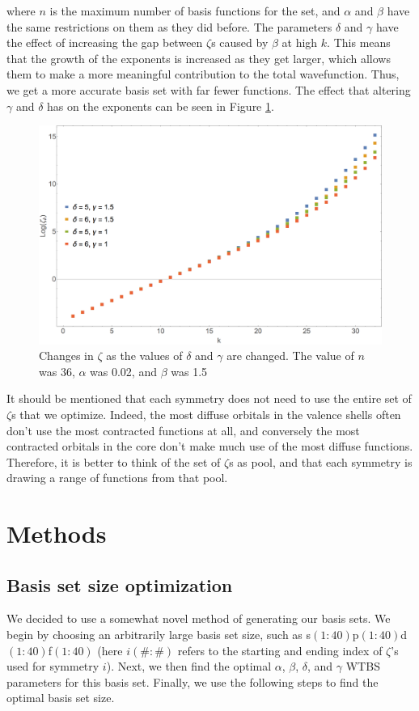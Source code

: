 where $n$ is the maximum number of basis functions for the set, and $\alpha$ and $\beta$ have the same restrictions on them as they did before. The parameters $\delta$ and $\gamma$ have the effect of increasing the gap between $\zeta$s caused by $\beta$ at high $k$. This means that the growth of the exponents is increased as they get larger, which allows them to make a more meaningful contribution to the total wavefunction. Thus, we get a more accurate basis set with far fewer functions. The effect that altering $\gamma$ and $\delta$ has on the exponents can be seen in Figure \ref{fig:deltagamm}.

\begin{figure}
\center
\includegraphics[width=1\textwidth]{Figures/deltagamm.png}
\caption[Changes in $\zeta$ as the values of $\delta$ and $\gamma$ are changed.]
{Changes in $\zeta$ as the values of $\delta$ and $\gamma$ are changed. The value of $n$ was 36, $\alpha$ was 0.02, and $\beta$ was 1.5}
\label{fig:deltagamm}
\end{figure}

It should be mentioned that each symmetry does not need to use the entire set of $\zeta$s that we optimize. Indeed, the most diffuse orbitals in the valence shells often don't use the most contracted functions at all, and conversely the most contracted orbitals in the core don't make much use of the most diffuse functions. Therefore, it is better to think of the set of $\zeta$s as pool, and that each symmetry is drawing a range of functions from that pool.  

\section{Methods}
\subsection{Basis set size optimization}
We decided to use a somewhat novel method of generating our basis sets. We begin by choosing an arbitrarily large basis set size, such as \mbox{s$(1:40)$p$(1:40)$d$(1:40)$f$(1:40)$} (here $i(\#:\#)$ refers to the starting and ending index of $\zeta$'s used for symmetry $i$). Next, we then find the optimal $\alpha$, $\beta$, $\delta$, and $\gamma$ WTBS parameters for this basis set. Finally, we use the following steps to find the optimal basis set size.

